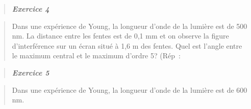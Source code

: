 \begin{quote}
\end{quote}

\begin{quote}
\emph{\textbf{Exercice 4}}
\end{quote}

\begin{quote}
Dans une expérience de Young, la longueur d'onde de la lumière est de
500 nm. La distance entre les fentes est de 0,1 mm et on observe la
figure d'interférence sur un écran situé à 1,6 m des fentes. Quel est
l'angle entre le maximum central et le maximum d'ordre 5? (Rép~:
\end{quote}

\begin{quote}
\end{quote}

\begin{quote}
\end{quote}

\begin{quote}
\end{quote}

\begin{quote}
\end{quote}

\begin{quote}
\end{quote}

\begin{quote}
\end{quote}

\begin{quote}
\end{quote}

\begin{quote}
\end{quote}

\begin{quote}
\end{quote}

\begin{quote}
\end{quote}

\begin{quote}
\end{quote}

\begin{quote}
\emph{\textbf{Exercice 5}}
\end{quote}

\begin{quote}
Dans une expérience de Young, la longueur d'onde de la lumière est de
600 nm.
\end{quote}

